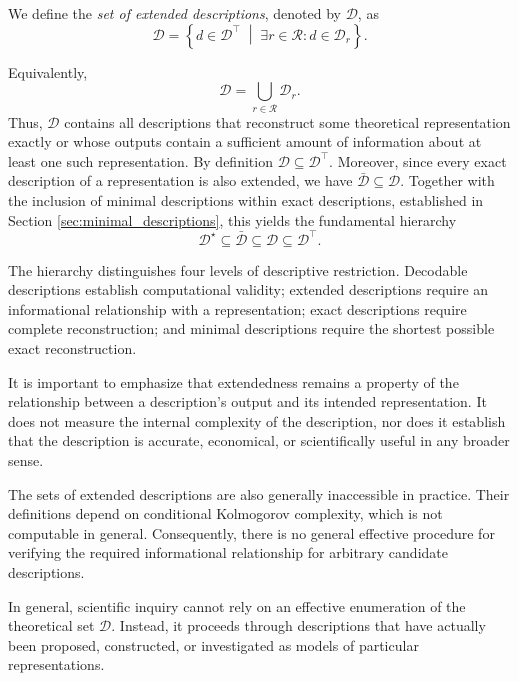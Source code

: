 \begin{definition}
\label{def:set_of_extended_descriptions}
We define the \emph{set of extended descriptions}, denoted by $\mathcal{D}$, as
\[
\mathcal{D} = \left\{d\in\mathcal{D}^\top \;\middle|\; \exists r\in\mathcal{R}: d\in\mathcal{D}_r \right\}.
\]
\end{definition}

Equivalently,
\[
\mathcal{D} = \bigcup_{r\in\mathcal{R}} \mathcal{D}_r.
\]
Thus, $\mathcal{D}$ contains all descriptions that reconstruct some theoretical representation exactly or whose outputs contain a sufficient amount of information about at least one such representation. By definition $\mathcal{D}\subseteq\mathcal{D}^\top$. Moreover, since every exact description of a representation is also extended, we have $\bar{\mathcal{D}}\subseteq\mathcal{D}$. Together with the inclusion of minimal descriptions within exact descriptions, established in Section \ref{sec:minimal_descriptions}, this yields the fundamental hierarchy
\[
\mathcal{D}^\star \subseteq \bar{\mathcal{D}} \subseteq \mathcal{D} \subseteq \mathcal{D}^\top.
\]

The hierarchy distinguishes four levels of descriptive restriction. Decodable descriptions establish computational validity; extended descriptions require an informational relationship with a representation; exact descriptions require complete reconstruction; and minimal descriptions require the shortest possible exact reconstruction.

It is important to emphasize that extendedness remains a property of the relationship between a description's output and its intended representation. It does not measure the internal complexity of the description, nor does it establish that the description is accurate, economical, or scientifically useful in any broader sense.

The sets of extended descriptions are also generally inaccessible in practice. Their definitions depend on conditional Kolmogorov complexity, which is not computable in general. Consequently, there is no general effective procedure for verifying the required informational relationship for arbitrary candidate descriptions.

In general, scientific inquiry cannot rely on an effective enumeration of the theoretical set $\mathcal{D}$. Instead, it proceeds through descriptions that have actually been proposed, constructed, or investigated as models of particular representations.

